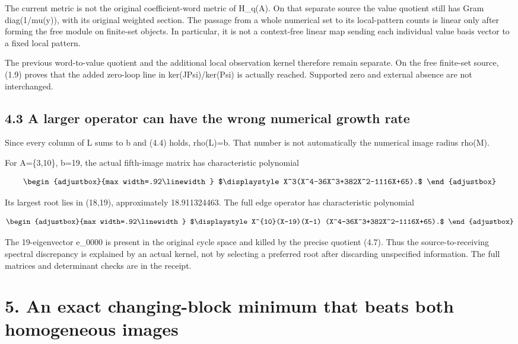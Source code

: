 The current metric is not the original coefficient-word metric of H\_q(A). On that separate source the value quotient still has Gram diag(1/mu(y)), with its original weighted section. The passage from a whole numerical set to its local-pattern counts is linear only after forming the free module on finite-set objects. In particular, it is not a context-free linear map sending each individual value basis vector to a fixed local pattern.

The previous word-to-value quotient and the additional local observation kernel therefore remain separate. On the free finite-set source, (1.9) proves that the added zero-loop line in ker(JPsi)/ker(Psi) is actually reached. Supported zero and external absence are not interchanged.

\subsection{4.3 A larger operator can have the wrong numerical growth rate}\label{n26-a-larger-operator-can-have-the-wrong-numerical-growth-rate}

Since every column of L sums to b and (4.4) holds, rho(L)=b. That number is not automatically the numerical image radius rho(M).

For A=\{3,10\}, b=19, the actual fifth-image matrix has characteristic polynomial

\[
\begin{adjustbox}{max width=.92\linewidth}
$\displaystyle X^3(X^4-36X^3+382X^2-1116X+65).$
\end{adjustbox}
\]

Its largest root lies in (18,19), approximately 18.911324463. The full edge operator has characteristic polynomial

\[
\begin{adjustbox}{max width=.92\linewidth}
$\displaystyle X^{10}(X-19)(X-1)
 (X^4-36X^3+382X^2-1116X+65).$
\end{adjustbox}
\]

The 19-eigenvector e\_0000 is present in the original cycle space and killed by the precise quotient (4.7). Thus the source-to-receiving spectral discrepancy is explained by an actual kernel, not by selecting a preferred root after discarding unspecified information. The full matrices and determinant checks are in the receipt.

\section{5. An exact changing-block minimum that beats both homogeneous images}\label{n26-an-exact-changing-block-minimum-that-beats-both-homogeneous-images}

